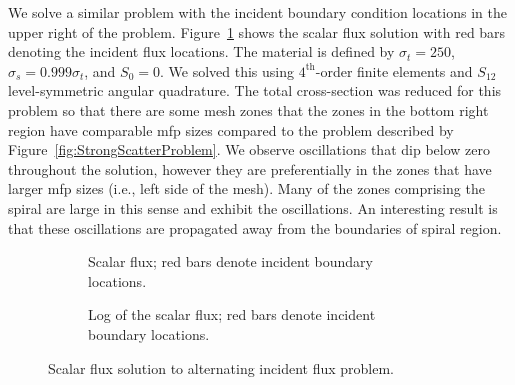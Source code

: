 \documentclass{article}
\begin{document}
We solve a similar problem with the incident boundary condition locations in the upper right of the problem. Figure~\ref{fig:AlternatingIncident3Pointv2Q4R1mfp250} shows the scalar flux solution with red bars denoting the incident flux locations. The material is defined by $\sigma_t=250$, $\sigma_s=0.999 \sigma_t$, and $S_0=0$. We solved this using $4^\text{th}$-order finite elements and $S_{12}$ level-symmetric angular quadrature. The total cross-section was reduced for this problem so that there are some mesh zones that the zones in the bottom right region have comparable mfp sizes compared to the problem described by Figure~\ref{fig:StrongScatterProblem}. We observe oscillations that dip below zero throughout the solution, however they are preferentially in the zones that have larger mfp sizes (i.e., left side of the mesh). Many of the zones comprising the spiral are large in this sense and exhibit the oscillations. An interesting result is that these oscillations are propagated away from the boundaries of spiral region.

\begin{figure}[!htb]
\centering
\begin{subfigure}{\textwidth}
\centering
{}
\caption{Scalar flux; red bars denote incident boundary locations.}
\end{subfigure}
\begin{subfigure}{\textwidth}
\centering
{}
\caption{Log of the scalar flux; red bars denote incident boundary locations.}
\end{subfigure}
\caption{Scalar flux solution to alternating incident flux problem.}
\label{fig:AlternatingIncident3Pointv2Q4R1mfp250}
\end{figure}





\FloatBarrier
\end{document}
